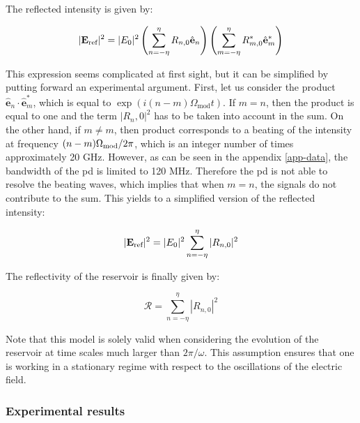 The reflected intensity is given by:

\begin{equation}
	|\mathbf{E}_{\text{ref}}|^2 = |E_0|^2 \left(\sum_{n=-\eta}^\eta R_{n,0} \hat{\mathbf{e}}_n \right) \left(\sum_{m=-\eta}^\eta R_{m,0}^* \hat{\mathbf{e}}_m^* \right)
\end{equation}

This expression seems complicated at first sight, but it can be simplified by putting forward an experimental argument. First, let us consider the product $\hat{\mathbf{e}}_n \cdot \hat{\mathbf{e}}_m^*$, which is equal to $\exp{(i(n-m)\Omega_{\text{mod}}t)}$. If $m=n$, then the product is equal to one and the term $|R_n,0|^2$ has to be taken into account in the sum. On the other hand, if $m\neq m$, then product corresponds to a beating of the intensity at frequency $(n-m)\Omega_{\text{mod}}/2\pi$, which is an integer number of times approximately 20 GHz. However, as can be seen in the appendix \ref{app-data}, the bandwidth of the \gls{pd} is limited to 120 MHz. Therefore the \gls{pd} is not able to resolve the beating waves, which implies that when $m=n$, the signals do not contribute to the sum. This yields to a simplified version of the reflected intensity:

\begin{equation}
	|\mathbf{E}_{\text{ref}}|^2 = |E_0|^2 \sum_{n=-\eta}^\eta |R_{n,0}|^2
\end{equation}

The reflectivity of the reservoir is finally given by:

\begin{equation}
	\mathcal{R} = \sum_{n=-\eta}^\eta |R_{n,0}|^2
\end{equation}

Note that this model is solely valid when considering the evolution of the reservoir at time scales much larger than $2\pi / \omega$. This assumption ensures that one is working in a stationary regime with respect to the oscillations of the electric field.


\subsubsection{Experimental results}

